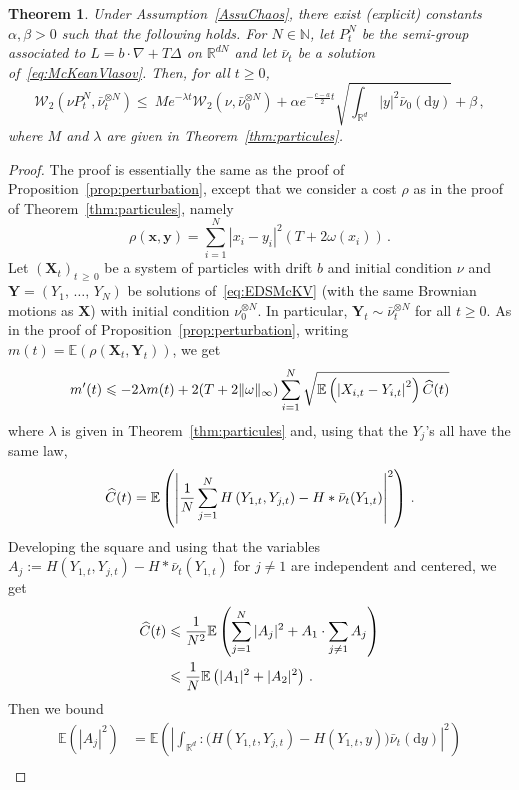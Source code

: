 \documentclass[10pt]{amsart}
\newtheorem{theo}{Theorem}[section]
\theoremstyle{definition}\newtheorem{defi}[theo]{Definition}\newtheorem{rema}[theo]{Remark}\newtheorem{exam}[theo]{Example}\newtheorem{exem}[theo]{Example}\newtheorem{nota}[theo]{Notation}
\newcommand{\R}{\mathbb R}
\newcommand{\bbE}{\mathbb E}
\newcommand{\clW}{\mathcal W}
\newcommand{\N}{\mathbb N}
\newcommand{\dd}{\mathrm{d}}
\newcommand{\na}{\nabla}
\newcommand{\1}{\mathbbm{1}}
\newcommand{\bx}{\mathbf{x}}
\newcommand{\by}{\mathbf{y}}
\newcommand{\bX}{\mathbf{X}}
\newcommand{\bY}{\mathbf{Y}}
\newcommand{\nv}[1]{#1}
\let\oldhat\hat
\renewcommand*{\hat}[1]{\mathchoice{\widehat{#1}}{\widehat{#1}}{\oldhat{#1}}{\oldhat{#1}}}
\begin{document}
\begin{theo}\label{thm:champmoyen}
Under Assumption~\ref{AssuChaos}, there exist (explicit) constants $\alpha,\beta>0$ such that the following holds. For $N\in\N$, let $P_t^N$ be the semi-group associated to $L= b\cdot\na + T\Delta$ on $\R^{dN}$ and let $\bar \nu_t$ be a solution of~\eqref{eq:McKeanVlasov}. Then, for all $t\geqslant 0$,
\[
\clW_2 \left( \nu P_t^N, \bar \nu_t^{\otimes N}\right) \leqslant \ M e^{-\lambda t} \clW_2 \left( \nu, \bar \nu_0^{\otimes N}\right) + \alpha e^{-\frac{c-a}{2}t}\sqrt{\int_{\R^d} |y|^2 \bar \nu_0(\dd y)} + \beta \,,
\]
where $M$ and $\lambda$ are given in Theorem~\ref{thm:particules}.
\end{theo}
\begin{proof}
The proof is essentially the same as the proof of Proposition~\ref{prop:perturbation}, except that we consider a \nv{cost} $\rho$ as in the proof of Theorem~\ref{thm:particules}, namely
\[
\rho(\bx,\by) = \sum_{i=1}^N |x_i-y_i|^2 \left( T+2\nv{\omega}(x_i)\right) \,.
\]
Let $(\bX_t)_{t\,\geqslant\,0}$ be a system of particles with drift $b$ and initial condition $\nu$ and $\bY=(Y_1,\,\dots,\,Y_N)$ be solutions of~\eqref{eq:EDSMcKV} (with the same Brownian motions as $\bX$) with initial condition $ \nu_0^{\otimes N}$. In particular, $\bY_t \sim \nv{\bar \nu}_t^{\otimes N}$ for all $t\geqslant 0$. As in the proof of Proposition~\ref{prop:perturbation}, writing $m(t) = \bbE( \rho(\bX_t,\bY_t))$, we get
\begin{equation}\label{eq:demochaos}
m'(t) \leqslant -2\lambda m(t) + 2 (T+2\|\nv{\omega}\|_\infty) \sum_{i=1}^N \sqrt{ \bbE \left( \left|X_{i,t} - Y_{i,t}\right|^2\right) \hat C(t) }
\end{equation}
where $\lambda$ is given in Theorem~\ref{thm:particules} and, using that the $Y_j$'s all have the same law,
\[
\hat C(t) = \bbE\left( \left|\frac1N\sum_{j=1}^N H\left(Y_{1,t},Y_{j,t}\right) - H\ast \bar \nu_t(Y_{1,t})\right|^2\right)\,.
\]
Developing the square and using that the variables $A_j:= H(Y_{1,t},Y_{j,t}) - H\ast \bar \nu_t(Y_{1,t})$ for $j\neq 1$ are independent and centered, we get
\begin{align*}
\hat C(t)& \leqslant \frac1{N^2} \bbE \left( \sum_{j=1}^N |A_j|^2 + A_1\cdot \sum_{j\neq 1} A_j \right) \\
& \leqslant \frac1{N} \bbE \left( |A_1|^2 + |A_2|^2 \right)\,.
\end{align*}
Then we bound
\begin{align*}
\bbE \left( \left|A_j\right|^2 \right) &= \bbE\left( \left| \int_{\R^d} :\big(H\left(Y_{1,t},Y_{j,t}\right) - H\left(Y_{1,t},y\right)\big) \bar \nu_t(\dd y)\right|^2 \right) \\

\end{align*}
\end{proof}
\end{document}
